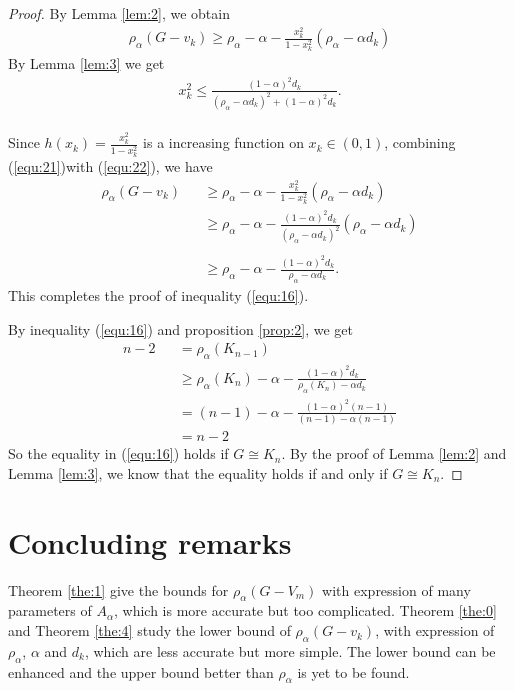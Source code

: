 \documentclass[amsthm]{elsart}
\begin{document}
\begin{proof}
By Lemma \ref {lem:2}, we obtain \\
\begin{eqnarray} \label{equ:21}
\rho _\alpha (G - v_k)
    \geqslant \rho _\alpha - \alpha - \frac{x_k^2}{1 - x_k^2} (\rho _\alpha - \alpha d_k)
\end{eqnarray}
By Lemma \ref {lem:3} we get
\begin{eqnarray} \label{equ:22}
x_k^2 \leqslant \frac{(1 - \alpha)^2 d_k}{(\rho _\alpha - \alpha d_k)^2 + (1 - \alpha)^2 d_k}.
\end{eqnarray}
\\
Since $h(x_k) = \frac{x_k^2}{1 - x_k^2} $ is a increasing function on $x_k \in (0, 1)$, combining (\ref{equ:21})with (\ref{equ:22}), we have  \\
\begin{eqnarray*}
\rho _\alpha (G - v_k)
  &&\geqslant \rho _\alpha - \alpha - \frac{x_k^2}{1 - x_k^2} (\rho _\alpha - \alpha d_k)
  \\ &&\geqslant \rho _\alpha - \alpha - \frac{(1 - \alpha)^2 d_k}{(\rho _\alpha - \alpha d_k)^2} (\rho _\alpha - \alpha d_k)  \\
  \\ &&\geqslant \rho _\alpha - \alpha - \frac{(1 - \alpha)^2 d_k}{\rho _\alpha - \alpha d_k}
.
\end{eqnarray*}
This completes the proof of inequality (\ref{equ:16}).

 By inequality (\ref{equ:16}) and proposition \ref{prop:2}, we get
\begin{eqnarray*}
n - 2 &&= \rho_\alpha(K_{n - 1})
\\ &&\geqslant \rho _\alpha(K_n) - \alpha - \frac{(1 - \alpha)^2 d_k}{\rho _\alpha(K_n) - \alpha d_k}
\\ &&= (n-1) - \alpha - \frac{(1 - \alpha)^2 (n-1)}{(n-1) - \alpha (n-1)}
\\ &&= n - 2
\end{eqnarray*}
So the equality in (\ref{equ:16})  holds if $G \cong K_n$.
By the proof of Lemma \ref {lem:2} and Lemma \ref {lem:3}, we know that the equality holds if and only if $G \cong K_n$.

\end{proof}


\section{Concluding remarks}

Theorem \ref{the:1} give the bounds for $\rho_\alpha(G-V_m)$ with expression of many parameters of $A_\alpha$, which is more accurate but too complicated.
Theorem \ref{the:0} and Theorem \ref{the:4} study the lower bound of $\rho_\alpha(G-v_k)$, with expression of $\rho_\alpha$, $\alpha$ and $d_k$, which are less accurate but more simple.
The lower bound can be enhanced and the upper bound better than $\rho_\alpha$ is yet to be found.
\end{document}

